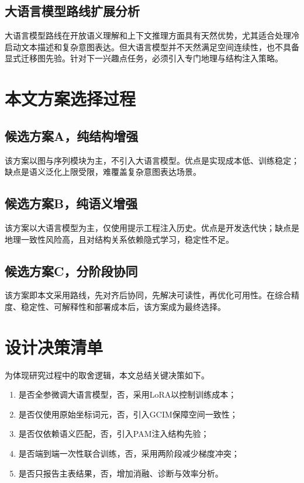 \subsection{大语言模型路线扩展分析}
大语言模型路线在开放语义理解和上下文推理方面具有天然优势，尤其适合处理冷启动文本描述和复杂意图表达。但大语言模型并不天然满足空间连续性，也不具备显式迁移图先验。针对下一兴趣点任务，必须引入专门地理与结构注入策略。

\section{本文方案选择过程}
\subsection{候选方案A，纯结构增强}
该方案以图与序列模块为主，不引入大语言模型。优点是实现成本低、训练稳定；缺点是语义泛化上限受限，难覆盖复杂意图表达场景。

\subsection{候选方案B，纯语义增强}
该方案以大语言模型为主，仅使用提示工程注入历史。优点是开发迭代快；缺点是地理一致性风险高，且对结构关系依赖隐式学习，稳定性不足。

\subsection{候选方案C，分阶段协同}
该方案即本文采用路线，先对齐后协同，先解决可读性，再优化可用性。在综合精度、稳定性、可解释性和部署成本后，该方案成为最终选择。

\section{设计决策清单}
为体现研究过程中的取舍逻辑，本文总结关键决策如下。
\begin{enumerate}
    \item 是否全参微调大语言模型，否，采用LoRA以控制训练成本；
    \item 是否仅使用原始坐标词元，否，引入GCIM保障空间一致性；
    \item 是否仅依赖语义匹配，否，引入PAM注入结构先验；
    \item 是否端到端一次性联合训练，否，采用两阶段减少梯度冲突；
    \item 是否只报告主表结果，否，增加消融、诊断与效率分析。
\end{enumerate}

